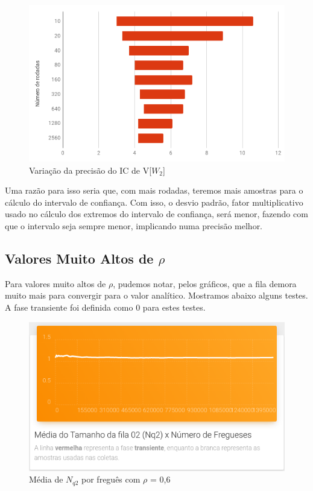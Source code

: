 \documentclass[a4paper,12pt]{report}
\begin{document}
\begin{figure}[H]
\includegraphics[width=1\textwidth]{./graficos/variacao_ic_w2.png}
\vspace{-10mm}
\caption{Variação da precisão do IC de V[$W_2$]}
\end{figure}


Uma razão para isso seria que, com mais rodadas, teremos mais amostras para o cálculo do intervalo de confiança. Com isso, o desvio padrão, fator multiplicativo usado no cálculo dos extremos do intervalo de confiança, será menor, fazendo com que o intervalo seja sempre menor, implicando numa precisão melhor.


\subsection{Valores Muito Altos de $\rho$}

Para valores muito altos de $\rho$, pudemos notar, pelos gráficos, que a fila demora muito mais para convergir para o valor analítico. Mostramos abaixo alguns testes. A fase transiente foi definida como 0 para estes testes.

\vspace{10mm}

\begin{figure}[H]
\includegraphics[width=1\textwidth]{./graficos/rho06compara.png}
\vspace{-10mm}
\caption{Média de $N_{q2}$ por freguês com $\rho$ = 0,6}
\end{figure}
\end{document}
